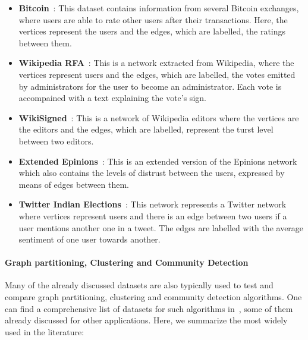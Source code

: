   \begin{itemize}
    \item \textbf{Bitcoin}~\cite{moore2013beware}: This dataset contains information from
      several Bitcoin exchanges, where users are able to rate other users after
      their transactions. Here, the vertices represent the users and the edges,
      which are labelled, the ratings between them.
    \item \textbf{Wikipedia RFA}~\cite{west2014exploiting}: This is a network extracted
      from Wikipedia, where the vertices represent users  and the
      edges, which are labelled, the votes emitted by administrators for the
      user to become an administrator.  Each vote is accompained with a text
      explaining the vote's sign.
    \item \textbf{WikiSigned}~\cite{maniu2011building}: This is a network of Wikipedia
      editors where the vertices are the editors and the edges, which are
      labelled, represent the turst level between two editors.
    \item \textbf{Extended Epinions}~\cite{massa2007trust}: This is an extended version of
      the Epinions network which also contains the levels of distrust between the
      users, expressed by means of edges between them.
    \item \textbf{Twitter Indian Elections}~\cite{kagan2015using}: This network represents
      a Twitter network where vertices represent users and there is an edge
      between two users if a user mentions another one in a tweet. The edges
      are labelled with the average sentiment of one user towards another.
  \end{itemize}


\paragraph{Graph partitioning, Clustering and Community Detection}

Many of the already discussed datasets are also typically used to test and
compare graph partitioning, clustering and community detection algorithms. One
can find a comprehensive list of datasets for such algorithms
in~\cite{10dimacs,yang2015defining}, some of them already discussed for other
applications. Here, we summarize the most widely used in the literature:

